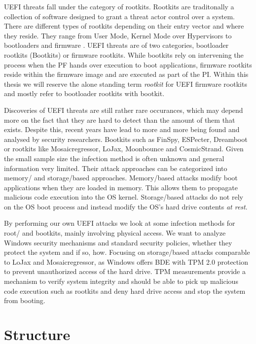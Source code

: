 \ac{UEFI} threats fall under the category of rootkits.
Rootkits are traditonally a collection of software designed to grant a threat actor control over a system.
There are different types of rootkits depending on their entry vector and where they reside.
They range from User Mode, Kernel Mode over Hypervisors to bootloaders and firmware \cite{crowdstrike, techtarget, microsoft-secure-the-windows-boot-process}.
\ac{UEFI} threats are of two categories, bootloader rootkits (Bootkits) or firmware rootkits.
While bootkits rely on intervening the process when the \ac{PF} hands over execution to boot applications, firmware rootkits reside within the firmware image and are executed as part of the \ac{PI}.
Within this thesis we will reserve the alone standing term \emph{rootkit} for \ac{UEFI} firmware rootkits and mostly refer to bootloader rootkits with bootkit.

Discoveries of \ac{UEFI} threats are still rather rare occurances, which may depend more on the fact that they are hard to detect than the amount of them that exists.
Despite this, recent years have lead to more and more being found and analysed by security researchers.
Bootkits such as FinSpy, ESPecter, Dreamboot or rootkits like Mosaicregressor, LoJax, Moonbounce and CosmicStrand.
Given the small sample size the infection method is often unknown and general information very limited.
Their attack approaches can be categorized into memory\-/ and storage\-/based approaches.
Memory\-/based attacks modify boot applications when they are loaded in memory.
This allows them to propagate malicious code execution into the \ac{OS} kernel.
Storage\-/based attacks do not rely on the \ac{OS} boot process and instead modify the \ac{OS}'s hard drive contents \emph{at rest}.

By performing our own \ac{UEFI} attacks we look at some infection methods for root\-/ and bootkits, mainly involving physical access.
We want to analyze Windows security mechanisms and standard security policies, whether they protect the system and if so, how.
Focusing on storage\-/based attacks comparable to LoJax and Mosaicregressor, as Windows offers \ac{BDE} with \ac{TPM} 2.0 protection to prevent unauthorized access of the hard drive.
\ac{TPM} measurements provide a mechanism to verify system integrity and should be able to pick up malicious code execution such as rootkits and deny hard drive access and stop the system from booting.

\section*{Structure}

